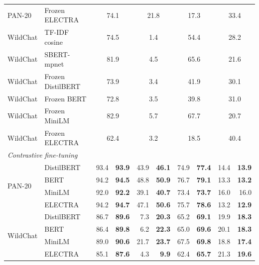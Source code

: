 \documentclass[11pt]{article}
\begin{document}
\begin{table}[!t]
\begin{tabular}{l l r r @{\hspace{1.7em}} r r @{\hspace{1.7em}} r r @{\hspace{1.7em}} r r}
PAN-20  & Frozen ELECTRA    & \multicolumn{2}{c}{74.1} & \multicolumn{2}{c}{21.8} & \multicolumn{2}{c}{17.3} & \multicolumn{2}{c}{33.4} \\
WildChat & TF-IDF cosine     & \multicolumn{2}{c}{74.5} & \multicolumn{2}{c}{\phantom{0}1.4} & \multicolumn{2}{c}{54.4} & \multicolumn{2}{c}{28.2} \\
WildChat & SBERT-mpnet       & \multicolumn{2}{c}{81.9} & \multicolumn{2}{c}{\phantom{0}4.5} & \multicolumn{2}{c}{65.6} & \multicolumn{2}{c}{21.6} \\
WildChat & Frozen DistilBERT & \multicolumn{2}{c}{73.9} & \multicolumn{2}{c}{\phantom{0}3.4} & \multicolumn{2}{c}{41.9} & \multicolumn{2}{c}{30.1} \\
WildChat & Frozen BERT       & \multicolumn{2}{c}{72.8} & \multicolumn{2}{c}{\phantom{0}3.5} & \multicolumn{2}{c}{39.8} & \multicolumn{2}{c}{31.0} \\
WildChat & Frozen MiniLM     & \multicolumn{2}{c}{82.9} & \multicolumn{2}{c}{\phantom{0}5.7} & \multicolumn{2}{c}{67.7} & \multicolumn{2}{c}{20.7} \\
WildChat & Frozen ELECTRA    & \multicolumn{2}{c}{62.4} & \multicolumn{2}{c}{\phantom{0}3.2} & \multicolumn{2}{c}{18.5} & \multicolumn{2}{c}{40.4} \\
\midrule
\multicolumn{10}{l}{\textit{Contrastive fine-tuning}} \\
\multirow{4}{*}{PAN-20}
 & DistilBERT & 93.4 & \textbf{93.9} & 43.9 & \textbf{46.1} & 74.9 & \textbf{77.4} & 14.4 & \textbf{13.9} \\
 & BERT       & 94.2 & \textbf{94.5} & 48.8 & \textbf{50.9} & 76.7 & \textbf{79.1} & 13.3 & \textbf{13.2} \\
 & MiniLM     & 92.0 & \textbf{92.2} & 39.1 & \textbf{40.7} & 73.4 & \textbf{73.7} & 16.0 & 16.0 \\
 & ELECTRA    & 94.2 & \textbf{94.7} & 47.1 & \textbf{50.6} & 75.7 & \textbf{78.6} & 13.2 & \textbf{12.9} \\
\midrule
\multirow{4}{*}{WildChat}
 & DistilBERT & 86.7 & \textbf{89.6} & \phantom{0}7.3 & \textbf{20.3} & 65.2 & \textbf{69.1} & 19.9 & \textbf{18.3} \\
 & BERT       & 86.4 & \textbf{89.8} & \phantom{0}6.2 & \textbf{22.3} & 65.0 & \textbf{69.6} & 20.1 & \textbf{18.3} \\
 & MiniLM     & 89.0 & \textbf{90.6} & 21.7 & \textbf{23.7} & 67.5 & \textbf{69.8} & 18.8 & \textbf{17.4} \\
 & ELECTRA    & 85.1 & \textbf{87.6} & \phantom{0}4.3 & \phantom{0}\textbf{9.9} & 62.4 & \textbf{65.7} & 21.3 & \textbf{19.6} \\

\end{tabular}
\end{table}
\end{document}

